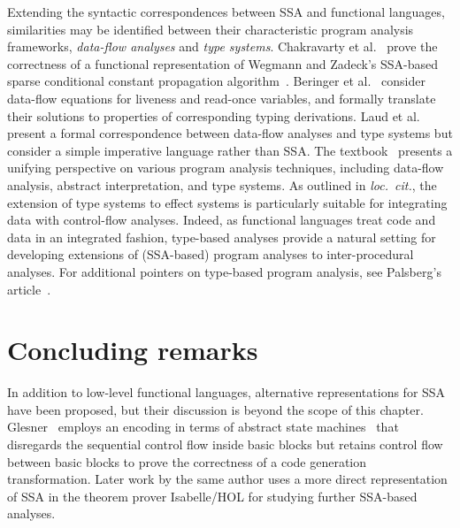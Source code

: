 {%

Extending the syntactic correspondences between SSA and functional
languages, similarities may be identified between their characteristic
program analysis frameworks, \emph{data-flow analyses} and \emph{type
systems}.  Chakravarty et al.~\cite{ChakravartyKZ:COCV03} prove the
correctness of a functional representation of Wegmann and Zadeck's
SSA-based sparse conditional constant propagation
algorithm~\cite{WegmannZ:Toplas1991}.  Beringer et
al.~\cite{DBLP:journals/entcs/BeringerMS03} consider data-flow
equations for liveness and read-once variables, and formally translate
their solutions to properties of corresponding typing derivations.
Laud et al.~\cite{DBLP:journals/tcs/LaudUV06} present a formal
correspondence between data-flow analyses and type systems but consider
a simple imperative language rather than SSA. The
textbook~\cite{DBLP:books/daglib/0015430} presents a unifying
perspective on various program analysis techniques, including data-flow analysis, abstract interpretation, and type systems. As outlined
in \emph{loc.~cit.}, the extension of type systems to effect systems
is particularly suitable for integrating data with control-flow
analyses. Indeed, as functional languages treat code and data in an
integrated fashion, type-based analyses provide a natural setting for
developing extensions of (SSA-based) program analyses to
inter-procedural analyses. For additional pointers on type-based
program analysis, see Palsberg's article~\cite{Palsberg:2001:TAA:379605.379635}.
%


\section{Concluding remarks}
\label{section:Part1:Semantics:Conclusion}
In addition to low-level functional languages, alternative
representations for SSA have been proposed, but their discussion is
beyond the scope of this chapter.
Glesner~\cite{DBLP:conf/asm/Glesner04} employs an encoding in terms of
abstract state machines~\cite{DBLP:journals/tocl/Gurevich00} that
disregards the sequential control flow inside basic blocks but retains
control flow between basic blocks to prove the correctness of a code
generation transformation. Later work by the same author uses a more
direct representation of SSA in the theorem prover Isabelle/HOL for
studying further SSA-based analyses.

}
